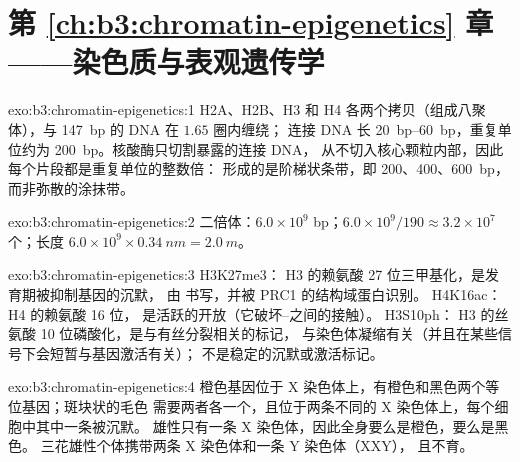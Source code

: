 \section*{第 \ref{ch:b3:chromatin-epigenetics} 章——染色质与表观遗传学}

\begin{solution}{exo:b3:chromatin-epigenetics:1}
H2A、H2B、H3 和 H4 各两个拷贝（组成八聚体），与 \qty{147}{bp} 的 DNA 在 $1.65$ 圈内缠绕；
连接 DNA 长 \qtyrange{20}{60}{bp}，重复单位约为 \qty{200}{bp}。核酸酶只切割暴露的连接 DNA，
从不切入核心颗粒内部，因此每个片段都是重复单位的整数倍：
形成的是阶梯状条带，即 \num{200}、\num{400}、\qty{600}{bp}，
而非弥散的涂抹带。
\end{solution}

\begin{solution}{exo:b3:chromatin-epigenetics:2}
二倍体：$6.0\times 10^{9}$ bp；$6.0\times 10^{9}/190 \approx
3.2\times 10^{7}$ 个；长度 $6.0\times 10^{9}\times
\qty{0.34}{nm} = \qty{2.0}{m}$。
\end{solution}

\begin{solution}{exo:b3:chromatin-epigenetics:3}
H3K27me3： H3 的赖氨酸 27 位三甲基化，是发育期被抑制基因的沉默，
由  书写，并被 PRC1 的结构域蛋白识别。
H4K16ac： H4 的赖氨酸 16 位，
是活跃的开放（它破坏–之间的接触）。
H3S10ph： H3 的丝氨酸 10 位磷酸化，是与有丝分裂相关的标记，
与染色体凝缩有关（并且在某些信号下会短暂与基因激活有关）；
不是稳定的沉默或激活标记。
\end{solution}

\begin{solution}{exo:b3:chromatin-epigenetics:4}
橙色基因位于 X 染色体上，有橙色和黑色两个等位基因；斑块状的毛色
需要两者各一个，且位于两条不同的 X 染色体上，每个细胞中其中一条被沉默。
雄性只有一条 X 染色体，因此全身要么是橙色，要么是黑色。
三花雄性个体携带两条 X 染色体和一条 Y 染色体（XXY），
且不育。
\end{solution}

